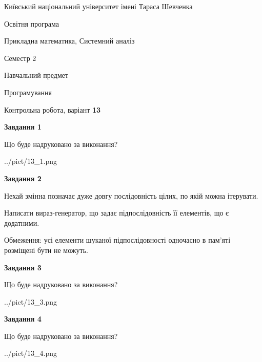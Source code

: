 \documentclass[12pt, ukrainian]{article}
\begin{document}
{{\begin {small}\par
{ \center  Київський національний університет імені Тараса Шевченка \par}
{\parbox {5 cm}{Освітня програма \hfill}{\parbox {8 cm}{Прикладна математика, Системний аналіз \hfill}}\parbox {5 cm}{\hfill Семестр 2}}\par
{\parbox {5 cm} {Навчальний предмет \hfill}\parbox {7 cm}{Програмування \hfill}\parbox {6cm}{\hfill}\par}\vspace{-7pt} \end{small}}{\center Контрольна робота, варіант  \No \textbf
{ 13 }\par}}
{
\begin {large}
{\begin {center}\textbf{Завдання 1}\end {center}}\par
Що буде надруковано за виконання?\par\par
\begin{center}
	{../pict/13_1.png}
\end{center}
\newpage

{\begin {center}\textbf{Завдання 2}\end {center}}\par
Нехай змінна  позначає дуже довгу послідовність цілих, по якій можна ітерувати.

Написати вираз-генератор, що задає підпослідовність її елементів, що є додатни\-ми.

Обмеження: усі елементи шуканої підпослідовності одночасно в пам'яті розміщені бути не можуть.\par
\newpage

{\begin {center}\textbf{Завдання 3}\end {center}}\par
Що буде надруковано за виконання?\par
\begin{center}
	{../pict/13_3.png}
\end{center}
\newpage

{\begin {center}\textbf{Завдання 4}\end {center}}\par
Що буде надруковано за виконання?\par
\begin{center}
	{../pict/13_4.png}
\end{center}
\newpage


\end{large}}
\end{document}
